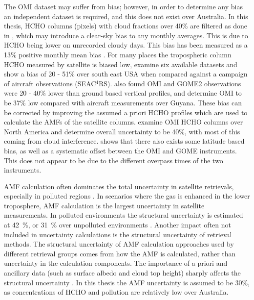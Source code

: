     The OMI dataset may suffer from bias; however, in order to determine any bias an independent dataset is required, and this does not exist over Australia.
    In this thesis, HCHO columns (pixels) with cloud fractions over 40\% are filtered as done in \textcite{Palmer2001}, which may introduce a clear-sky bias to any monthly averages.
    This is due to HCHO being lower on unrecorded cloudy days.
    This bias has been measured as a 13\% positive monthly mean bias \parencite{Palmer2001, Surl2018}.
    For many places the tropospheric column HCHO measured by satellite is biased low, \textcite{Zhu2016} examine six available datasets and show a bias of 20 - 51\% over south east USA when compared against a campaign of aircraft observations (SEAC$^4$RS).
    \textcite{DeSmedt2015} also found OMI and GOME2 observations were 20 - 40\% lower than ground based vertical profiles, and \textcite{Barkley2013} determine OMI to be 37\% low compared with aircraft measurements over Guyana.
    These bias can be corrected by improving the assumed a priori HCHO profiles which are used to calculate the AMFs of the satellite columns.
    \textcite{Millet2006} examine OMI HCHO columns over North America and determine overall uncertainty to be 40\%, with most of this coming from cloud interference.
    \textcite{Millet2008} shows that there also exists some latitude based bias, as well as a systematic offset between the OMI and GOME instruments.
    This does not appear to be due to the different overpass times of the two instruments.
    
    AMF calculation often dominates the total uncertainty in satellite retrievals, especially in polluted regions \parencite{Lorente2017}.
    In scenarios where the gas is enhanced in the lower troposphere, AMF calculation is the largest uncertainty in satellite measurements.
    In polluted environments the structural uncertainty is estimated at 42~\%, or 31~\% over unpolluted environments \parencite{Lorente2017}.
    Another impact often not included in uncertainty calculations is the structural uncertainty of retrieval methods.
    The structural uncertainty of AMF calculation approaches used by different retrieval groups comes from how the AMF is calculated, rather than uncertainty in the calculation components.
    The importance of a priori and ancillary data (such as surface albedo and cloud top height) sharply affects the structural uncertainty \parencite{Lorente2017}.
    In this thesis the AMF uncertainty is assumed to be $30\%$, as concentrations of HCHO and pollution are relatively low over Australia.
    
